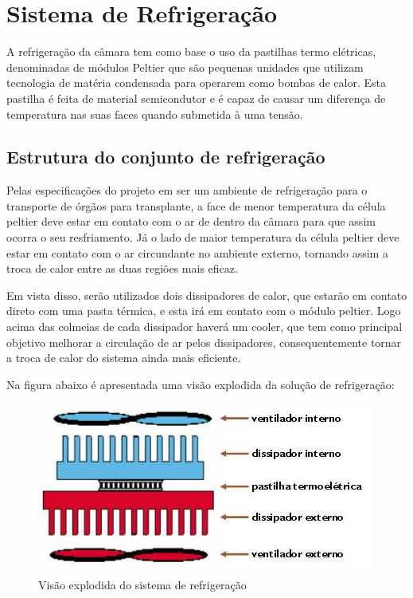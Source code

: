 \section{Sistema de Refrigeração}
A refrigeração da câmara tem como base o uso da pastilhas termo elétricas, denominadas de módulos Peltier que são pequenas unidades que utilizam tecnologia de matéria condensada para operarem como bombas de calor. Esta pastilha é feita de material semicondutor e é capaz de causar um diferença de temperatura nas suas faces quando submetida à uma tensão.

\subsection{Estrutura do conjunto de refrigeração}
Pelas especificações do projeto em ser um ambiente de refrigeração para o transporte de órgãos para transplante, a face de menor temperatura da célula peltier deve estar em contato com o ar de dentro da câmara para que assim ocorra o seu resfriamento. Já o lado de maior temperatura da célula peltier deve estar em contato com o ar circundante no ambiente externo, tornando assim a troca de calor entre as duas regiões mais eficaz.

Em vista disso, serão utilizados dois dissipadores de calor, que estarão em contato direto com uma pasta térmica, e esta irá em contato com o módulo peltier. Logo acima das colmeias de cada dissipador haverá um cooler, que tem como principal objetivo melhorar a circulação de ar pelos dissipadores, consequentemente tornar a troca de calor do sistema ainda mais eficiente.

Na figura abaixo é apresentada uma visão explodida da solução de refrigeração:

\begin{figure}[H]
\begin{center}
\includegraphics[scale = 1]{figuras/Sistema_Ref.JPG}
\caption{Visão explodida do sistema de refrigeração}
\end{center}
\end{figure}

